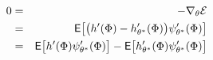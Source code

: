 \begin{equation}
\begin{aligned}
	0 & = & - \nabla_\param \mathcal{E} \\
	   & = &  \Expect \bigl[\bigl(h'(\markovstate) - h'_{\param^*} (\markovstate)\bigr) \basis'_{\param^*} (\markovstate)\bigr]\\
	& = &   \Expect \bigl[ h'(\markovstate)\basis'_{\param^*} (\markovstate) \bigr] - \Expect \bigl[ h'_{\param^*} (\markovstate)\basis'_{\param^*} (\markovstate) \bigr]
\label{e:diff_td_gradTD_nl}
\end{aligned}
\end{equation}

